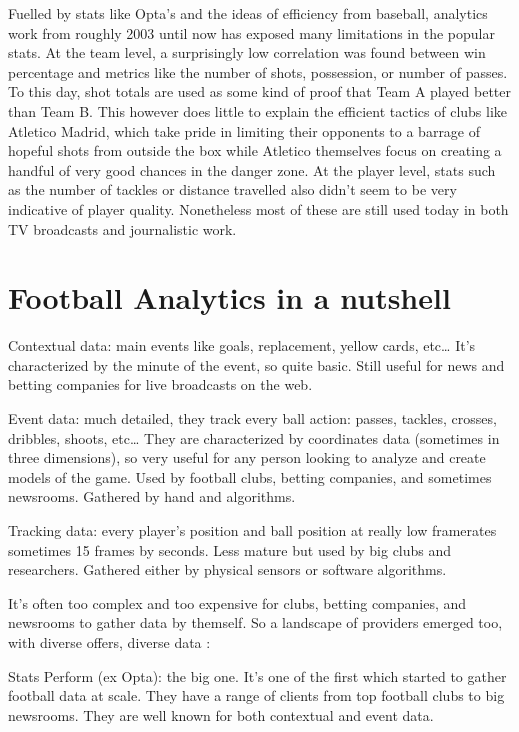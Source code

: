 Fuelled by stats like Opta’s and the ideas of efficiency from baseball, 
analytics work from roughly 2003 until now has exposed many limitations 
in the popular stats. At the team level, a surprisingly low correlation 
was found between win percentage and metrics like the number of shots, 
possession, or number of passes. To this day, shot totals are used as 
some kind of proof that Team A played better than Team B. This however 
does little to explain the efficient tactics of clubs like Atletico Madrid, 
which take pride in limiting their opponents to a barrage of hopeful shots 
from outside the box while Atletico themselves focus on creating a handful 
of very good chances in the danger zone. At the player level, stats such as 
the number of tackles or distance travelled also didn’t seem to be very 
indicative of player quality. Nonetheless most of these are still used 
today in both TV broadcasts and journalistic work.


\section{Football Analytics in a nutshell}

Contextual data: main events like goals, replacement, yellow cards, etc… 
It’s characterized by the minute of the event, so quite basic. Still useful 
for news and betting companies for live broadcasts on the web.

Event data: much detailed, they track every ball action: passes, tackles, 
crosses, dribbles, shoots, etc… They are characterized by coordinates data 
(sometimes in three dimensions), so very useful for any person looking to 
analyze and create models of the game. Used by football clubs, betting 
companies, and sometimes newsrooms. Gathered by hand and algorithms.

Tracking data: every player's position and ball position at really low 
framerates sometimes 15 frames by seconds. Less mature but used by big 
clubs and researchers. Gathered either by physical sensors or software 
algorithms.

It’s often too complex and too expensive for clubs, betting companies, 
and newsrooms to gather data by themself. So a landscape of providers 
emerged too, with diverse offers, diverse data :

Stats Perform (ex Opta): the big one. It’s one of the first which started 
to gather football data at scale. They have a range of clients from top 
football clubs to big newsrooms. They are well known for both contextual 
and event data.


